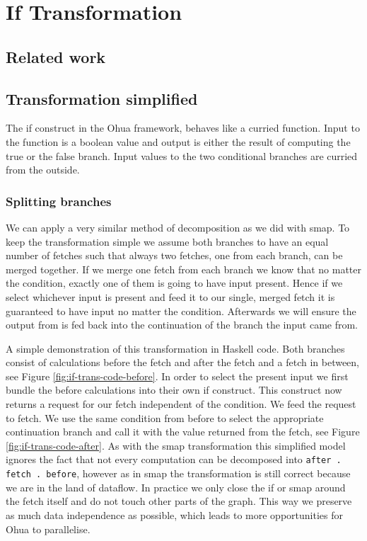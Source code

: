 \chapter{If Transformation}

\label{ch:if-transformation}

\newcommand{\opite}{\texttt{ifThenElse}}
\newcommand{\opselect}{\texttt{select}}

\section{Related work}


\section{Transformation simplified}

The if construct in the Ohua framework, behaves like a curried function.
Input to the function is a boolean value and output is either the result of computing the true or the false branch.
Input values to the two conditional branches are curried from the outside.


\subsection{Splitting branches}

We can apply a very similar method of decomposition as we did with smap.
To keep the transformation simple we assume both branches to have an equal number of fetches such that always two fetches, one from each branch, can be merged together.
If we merge one fetch from each branch we know that no matter the condition, exactly one of them is going to have input present.
Hence if we select whichever input is present and feed it to our single, merged fetch it is guaranteed to have input no matter the condition.
Afterwards we will ensure the output from \fetch{} is fed back into the continuation of the branch the input came from.

A simple demonstration of this transformation in Haskell code.
Both branches consist of calculations before the fetch and after the fetch and a fetch in between, see Figure \ref{fig:if-trans-code-before}.
In order to select the present input we first bundle the before calculations into their own if construct.
This construct now returns a request for our fetch independent of the condition.
We feed the request to fetch.
We use the same condition from before to select the appropriate continuation branch and call it with the value returned from the fetch, see Figure \ref{fig:if-trans-code-after}.
As with the smap transformation this simplified model ignores the fact that not every computation can be decomposed into \texttt{after . fetch . before}, however as in smap the transformation is still correct because we are in the land of dataflow.
In practice we only close the if or smap around the fetch itself and do not touch other parts of the graph.
This way we preserve as much data independence as possible, which leads to more opportunities for Ohua to parallelise.

